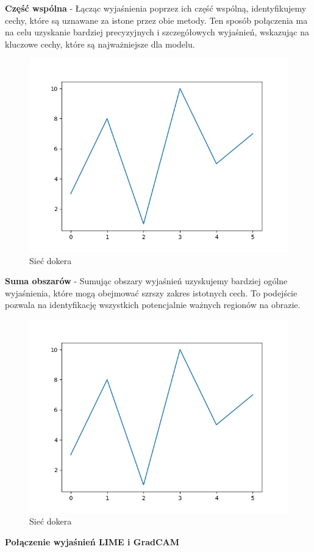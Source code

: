 \textbf{Część wspólna} - Łącząc wyjaśnienia poprzez ich część wspólną, identyfikujemy cechy, które są uznawane za istone przez obie metody.
Ten sposób połączenia ma na celu uzyskanie bardziej precyzyjnych i szczegółowych wyjaśnień, wskazując na kluczowe cechy, które są najważniejsze dla modelu.
\begin{figure}
  \centering\includegraphics[width=.6\textwidth]{images/example}
\caption{Sieć dokera \cite{docker_compose_reference}}  \label{rys:network}
\end{figure}

\textbf{Suma obszarów} - Sumując obszary wyjaśnień uzyskujemy bardziej ogólne wyjaśnienia, które mogą obejmować szrszy zakres istotnych cech.
To podejście pozwala na identyfikację wszystkich potencjalnie ważnych regionów na obrazie.
\begin{figure}
  \centering\includegraphics[width=.6\textwidth]{images/example}
\caption{Sieć dokera \cite{docker_compose_reference}}  \label{rys:network}
\end{figure}

\textbf{Połączenie wyjaśnień LIME i GradCAM}

